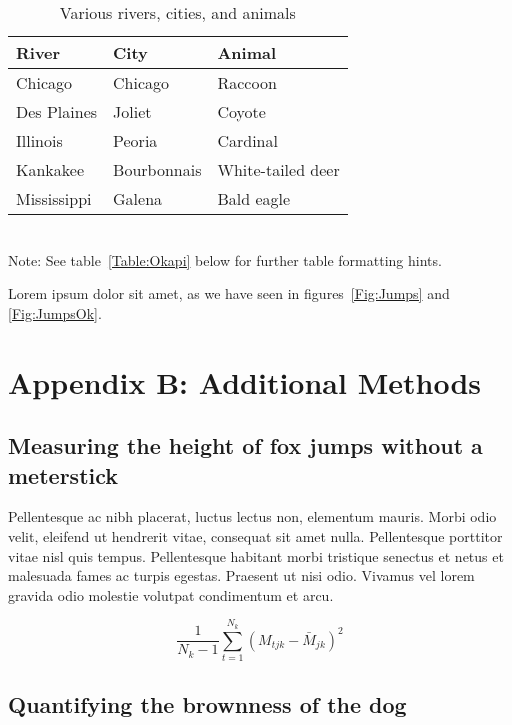 \documentclass[11pt]{article}
\begin{document}
\begin{table}[h]
\caption{Various rivers, cities, and animals}
\label{Table:Rivers}
\centering
\begin{tabular}{lll}\hline
River        & City        & Animal            \\ \hline
Chicago      & Chicago     & Raccoon           \\
Des Plaines  & Joliet      & Coyote            \\
Illinois     & Peoria      & Cardinal          \\
Kankakee     & Bourbonnais & White-tailed deer \\
Mississippi  & Galena      & Bald eagle        \\ \hline
\end{tabular}
\bigskip{}
\\
{\footnotesize Note: See table~\ref{Table:Okapi} below for further table formatting hints.}
\end{table}

Lorem ipsum dolor sit amet, as we have seen in figures~\ref{Fig:Jumps} and \ref{Fig:JumpsOk}.

\newpage{}

\section*{Appendix B: Additional Methods}

\subsection*{Measuring the height of fox jumps without a meterstick}

Pellentesque ac nibh placerat, luctus lectus non, elementum mauris.
Morbi odio velit, eleifend ut hendrerit vitae, consequat sit amet
nulla. Pellentesque porttitor vitae nisl quis tempus. Pellentesque
habitant morbi tristique senectus et netus et malesuada fames ac
turpis egestas. Praesent ut nisi odio. Vivamus vel lorem gravida
odio molestie volutpat condimentum et arcu.

\begin{equation}
{ \frac{1}{N_k-1} \sum \limits_{t=1}^{N_k} (M_{tjk} - \bar{M}_{jk})^2}
\end{equation}

\subsection*{Quantifying the brownness of the dog}
\end{document}
